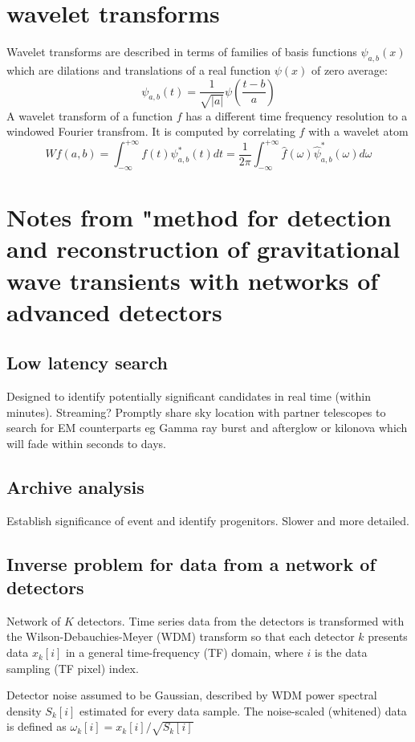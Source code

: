 \section{wavelet transforms}
Wavelet transforms are described in terms of families of basis functions $\psi_{a,b}(x)$ which are dilations and translations of a real function $\psi(x)$ of zero average:
\[ \psi_{a,b}(t)=\frac{1}{\sqrt{|a|}}\psi\left(\frac{t-b}{a}\right) \]
A wavelet transform of a function $f$ has a different time frequency resolution to a windowed Fourier transfrom. It is computed by correlating $f$ with a wavelet atom 
\[Wf(a,b)=\int^{+\infty}_{-\infty}f(t)\psi^{*}_{a,b}(t)dt=\frac{1}{2\pi}\int^{+\infty}_{-\infty} \hat{f}(\omega)\hat{\psi}^{*}_{a,b}(\omega) d\omega \]

\section{Notes from "method for detection and reconstruction of gravitational wave transients with networks of advanced detectors}
\subsection{Low latency search}
Designed to identify potentially significant candidates in real time (within minutes). Streaming? Promptly share sky location with partner telescopes to search for EM counterparts eg Gamma ray burst and afterglow or kilonova which will fade within seconds to days. 

\subsection{Archive analysis}
Establish significance of event and identify progenitors. Slower and more detailed. 

\subsection{Inverse problem for data from a network of detectors}
Network of $K$ detectors. Time series data from the detectors is transformed with the Wilson-Debauchies-Meyer (WDM) transform so that each detector $k$ presents data $x_k[i]$ in a general time-frequency (TF) domain, where $i$ is the data sampling (TF pixel) index. 

Detector noise assumed to be Gaussian, described by WDM power spectral density $S_k[i]$ estimated for every data sample. The noise-scaled (whitened) data is defined as $\omega_k[i] = x_k[i]/\sqrt{S_k[i]}$

